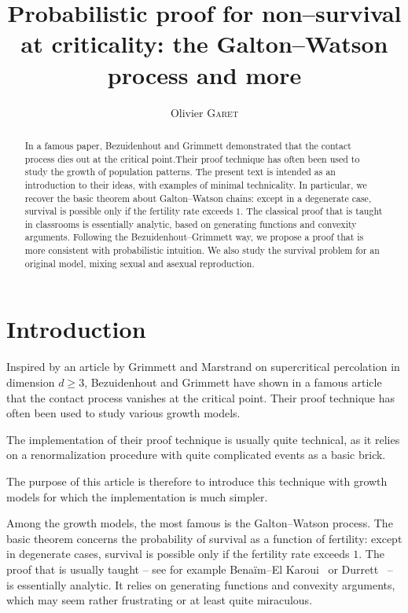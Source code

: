 \documentclass[svgnames]{amsart}
\author{Olivier \textsc{Garet}}
\title[Probabilistic proof for non--survival at criticality]{Probabilistic proof for non--survival at criticality: the Galton--Watson process and more}%
\newcommand{\1}{\mathbbo{1}}
\begin{document}


\maketitle
\begin{abstract}
In a famous paper, Bezuidenhout and Grimmett demonstrated that the contact process dies out at the critical point.Their proof technique has often been used to study the growth of population patterns.
The present text is intended as an introduction to their ideas, with examples of minimal technicality. In particular, we recover the basic theorem about 
Galton--Watson chains: except in a degenerate case, survival is possible only if the fertility rate exceeds $1$. The classical proof that is taught in classrooms is essentially analytic, based on generating functions and convexity arguments. Following the Bezuidenhout--Grimmett way, we propose a proof that is more consistent with probabilistic intuition.
We also study the survival problem for an original model, mixing sexual and asexual reproduction.
\end{abstract}


\section{Introduction}
Inspired by an article by Grimmett and Marstrand on supercritical  percolation in dimension $d\ge 3$, Bezuidenhout and Grimmett have shown in a famous article that the contact process vanishes at the critical point.
Their proof technique has often been used to study various growth  models.

The implementation of their proof technique is usually quite technical, as it relies on a renormalization procedure with quite complicated events as a basic brick.

The purpose of this article is therefore to introduce this technique with growth models for which the implementation is much simpler.


Among the growth models, the most famous is the Galton--Watson process.
The basic theorem concerns the probability of survival as a function of fertility: except in degenerate cases, survival is possible only if the fertility rate exceeds $1$.
The proof that is usually taught  -- see for example  Benaïm--El Karoui~\cite{BEK} or Durrett~\cite{Durrett} --  is essentially analytic. It relies on generating functions and convexity arguments, which may seem rather frustrating or at least quite miraculous.
\end{document}
